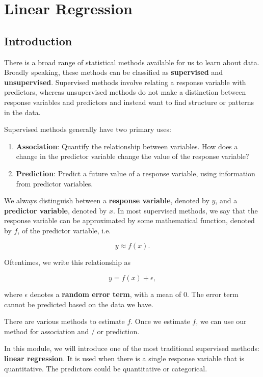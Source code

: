 \documentclass[
]{book}
\providecommand{\tightlist}{%
  \setlength{\itemsep}{0pt}\setlength{\parskip}{0pt}}
\begin{document}
\chapter{Linear Regression}\label{linear-regression}

\section{Introduction}\label{introduction-6}

There is a broad range of statistical methods available for us to learn about data. Broadly speaking, these methods can be classified as \textbf{supervised} and \textbf{unsupervised}. Supervised methods involve relating a response variable with predictors, whereas unsupervised methods do not make a distinction between response variables and predictors and instead want to find structure or patterns in the data.

Supervised methods generally have two primary uses:

\begin{enumerate}
\def\labelenumi{\arabic{enumi}.}
\tightlist
\item
  \textbf{Association}: Quantify the relationship between variables. How does a change in the predictor variable change the value of the response variable?
\item
  \textbf{Prediction}: Predict a future value of a response variable, using information from predictor variables.
\end{enumerate}

We always distinguish between a \textbf{response variable}, denoted by \(y\), and a \textbf{predictor variable}, denoted by \(x\). In most supervised methods, we say that the response variable can be approximated by some mathematical function, denoted by \(f\), of the predictor variable, i.e.

\[
y \approx f(x).
\]

Oftentimes, we write this relationship as

\[
y = f(x) + \epsilon,
\]

where \(\epsilon\) denotes a \textbf{random error term}, with a mean of 0. The error term cannot be predicted based on the data we have.

There are various methods to estimate \(f\). Once we estimate \(f\), we can use our method for association and / or prediction.

In this module, we will introduce one of the most traditional supervised methods: \textbf{linear regression}. It is used when there is a single response variable that is quantitative. The predictors could be quantitative or categorical.
\end{document}
